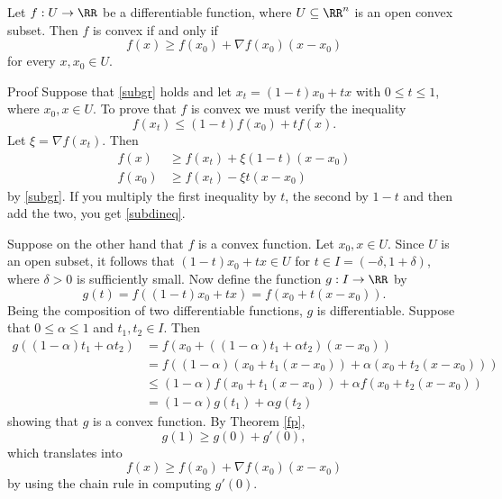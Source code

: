 \documentclass{article}
\begin{document}
\begin{theorem}[emph]\label{thmdiffsubdif}
  Let $f: U\rightarrow \RR$ be a differentiable function, where
  $U\subseteq \RR^n$ is an open convex subset. Then $f$ is convex if
  and only if
  \begin{equation}
    f(x) \geq f(x_0) + \nabla f(x_0) (x-x_0)\label{subgr}
  \end{equation}
  for every $x, x_0\in U$.
\end{theorem}
\begin{hideinbutton}{Proof}
  Suppose that \eqref{subgr} holds and let $x_t = (1-t)x_0 + t x$ with
  $0 \leq t \leq 1$, where $x_0, x\in U$.  To prove that $f$ is convex
  we must verify the inequality
  \begin{equation}
    f(x_t) \leq (1-t) f(x_0) + t f(x).\label{subdineq}
  \end{equation}
  Let $\xi = \nabla f(x_t)$. Then
  \begin{align*}
    f(x) &\geq f(x_t) + \xi (1-t) (x-x_0)\\
    f(x_0) &\geq f(x_t) - \xi t (x-x_0)
  \end{align*}
  by \eqref{subgr}.  If you multiply the first inequality by $t$, the
  second by $1-t$ and then add the two, you get \eqref{subdineq}.

  Suppose on the other hand that $f$ is a convex function. Let $x_0,
  x\in U$. Since $U$ is an open subset, it follows that $(1-t)x_0 + t
  x\in U$ for $t\in I=(-\delta, 1 + \delta)$, where $\delta>0$ is
  sufficiently small. Now define the function $g:I\rightarrow \RR$ by
  \begin{equation*}
    g(t) = f((1-t) x_0 + t x) = f(x_0 + t (x-x_0)).
  \end{equation*}
  Being the composition of two differentiable functions, $g$ is
  differentiable.  Suppose that $0\leq \alpha \leq 1$ and $t_1, t_2\in
  I$. Then
  \begin{align*}
   g((1- \alpha) t_1 + \alpha t_2) &= f(x_0 + ((1-\alpha)
    t_1 + \alpha t_2)(x-x_0))
    \\
    &=f((1-\alpha)(x_0 + t_1(x-x_0)) + \alpha (x_0+t_2(x-x_0)))
    \\
    &\leq(1-\alpha) f(x_0 + t_1 (x-x_0)) + \alpha f(x_0 + t_2(x-x_0))
    \\
    &=(1-\alpha) g(t_1) + \alpha g(t_2)
  \end{align*}
  showing that $g$ is a convex function.  By Theorem \ref{fp},
  \begin{equation*}
    g(1) \geq g(0) + g'(0),
  \end{equation*}
  which translates into
  \begin{equation*}
    f(x) \geq f(x_0) + \nabla f(x_0) (x-x_0)
  \end{equation*}
  by using the chain rule in computing $g'(0)$.
\end{hideinbutton}
\end{document}
